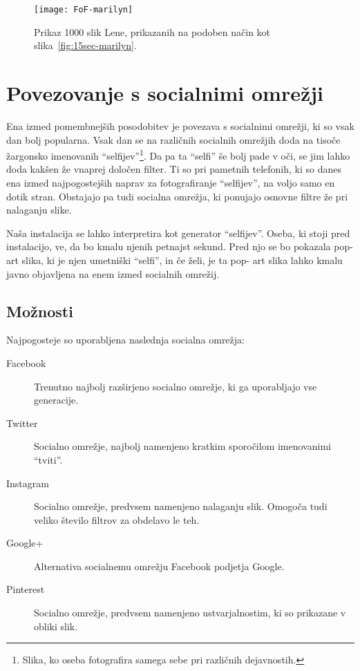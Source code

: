 \begin{figure}[!ht]
    \centering
    \texttt{[image: FoF-marilyn]}
    \caption{Prikaz 1000 slik Lene, prikazanih na podoben način kot slika~\ref{fig:15sec-marilyn}.}
    \label{fig:FoF-marilyn}
\end{figure}


\chapter{Povezovanje s socialnimi omrežji}
\label{ch:socialNetwork}
Ena izmed pomembnejših posodobitev je povezava s socialnimi omrežji, ki so
vsak dan bolj popularna. Vsak dan se na različnih socialnih omrežjih doda na
tisoče žargonsko imenovanih ``selfijev''\footnote{Slika, ko oseba fotografira
samega sebe pri različnih dejavnostih.}. Da pa ta ``selfi'' še bolj pade v
oči, se jim lahko doda kakšen že vnaprej določen filter. Ti so pri pametnih
telefonih, ki so danes ena izmed najpogostejših naprav za fotografiranje
``selfijev'', na voljo samo en dotik stran. Obstajajo pa tudi socialna
omrežja, ki ponujajo osnovne filtre že pri nalaganju slike.

Naša instalacija se lahko interpretira kot generator ``selfijev''. Oseba, ki
stoji pred instalacijo, ve, da bo kmalu njenih petnajst sekund. Pred njo se bo
pokazala pop-art slika, ki je njen umetniški ``selfi'', in če želi, je ta pop-
art slika lahko kmalu javno objavljena na enem izmed socialnih omrežij.


\section{Možnosti}
Najpogosteje so uporabljena naslednja socialna omrežja:
\begin{description}
\item[Facebook]
Trenutno najbolj razširjeno socialno omrežje, ki ga uporabljajo vse
generacije.

\item[Twitter]
Socialno omrežje, najbolj namenjeno kratkim sporočilom imenovanimi ``tviti''.

\item[Instagram]
Socialno omrežje, predvsem namenjeno nalaganju slik. Omogoča tudi veliko
število filtrov za obdelavo le teh.

\item[Google+]
Alternativa socialnemu omrežju Facebook podjetja Google.

\item[Pinterest]
Socialno omrežje, predvsem namenjeno ustvarjalnostim, ki so prikazane v obliki
slik.
\end{description}



